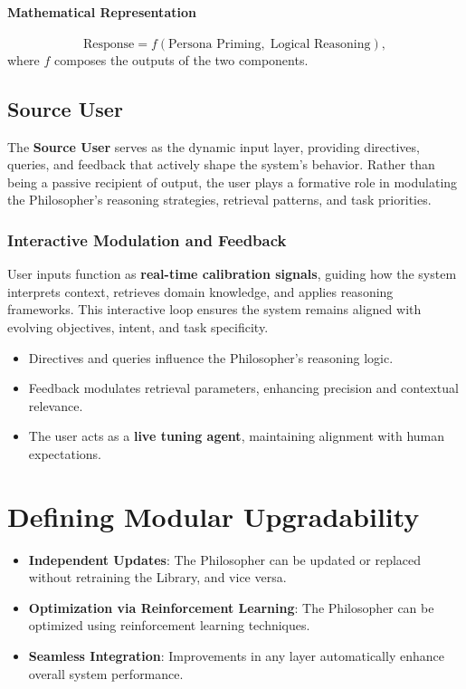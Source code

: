 \documentclass{article}
\begin{document}
\paragraph{Mathematical Representation}
\[
\text{Response} = f(\text{Persona Priming},\; \text{Logical Reasoning}),
\]
where $f$ composes the outputs of the two components.

\subsection{Source User}
The \textbf{Source User} serves as the dynamic input layer, providing directives, queries, and feedback that actively shape the system’s behavior. Rather than being a passive recipient of output, the user plays a formative role in modulating the Philosopher’s reasoning strategies, retrieval patterns, and task priorities.

\subsubsection{Interactive Modulation and Feedback}
User inputs function as \textbf{real-time calibration signals}, guiding how the system interprets context, retrieves domain knowledge, and applies reasoning frameworks. This interactive loop ensures the system remains aligned with evolving objectives, intent, and task specificity.


\begin{itemize}
  \item Directives and queries influence the Philosopher’s reasoning logic.
  \item Feedback modulates retrieval parameters, enhancing precision and contextual relevance.
  \item The user acts as a \textbf{live tuning agent}, maintaining alignment with human expectations.
\end{itemize}

\hrulefill{}

\section{Defining Modular Upgradability}
\begin{itemize}
  \item \textbf{Independent Updates}: The Philosopher can be updated or replaced without retraining the Library, and vice versa.
  \item \textbf{Optimization via Reinforcement Learning}: The Philosopher can be optimized using reinforcement learning techniques.
  \item \textbf{Seamless Integration}: Improvements in any layer automatically enhance overall system performance.
\end{itemize}
\end{document}
